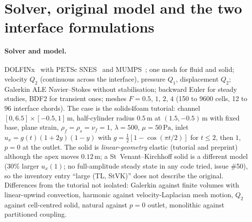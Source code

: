 \documentclass[sn-mathphys,Numbered]{sn-jnl}
\begin{document}
\section{Solver, original model and the two interface formulations}\label{sec:fx_solver}
\paragraph{Solver and model.}
DOLFINx~\citep{Baratta2023} with PETSc SNES~\citep{PETSc} and MUMPS~\citep{MUMPS:1,MUMPS:2}; one mesh for fluid and solid; velocity $Q_2$ (continuous across the interface), pressure $Q_1$, displacement $Q_2$; Galerkin ALE Navier--Stokes without stabilisation; backward Euler for steady studies, BDF2 for transient ones; meshes $F=0.5$, $1$, $2$, $4$ (150 to 9600 cells, 12 to 96 interface chords).
The case is the solids4foam tutorial: channel $[0,6.5]\times[-0.5,1]\,\mathrm{m}$, half-cylinder radius $0.5\,\mathrm{m}$ at $(1.5,-0.5)\,\mathrm{m}$ with fixed base, plane strain, $\rho_f=\rho_s=\nu_f=1$, $\lambda=500$, $\mu=50\,\mathrm{Pa}$, inlet $u_x=g(t)(1+2y)(1-y)$ with $g=\tfrac12[1-\cos(\pi t/2)]$ for $t\le2$, then $1$, $p=0$ at the outlet.
The solid is \emph{linear-geometry} elastic (tutorial and preprint) although the apex moves $0.12\,\mathrm{m}$; a St~Venant--Kirchhoff solid is a different model ($30\%$ larger $u_x(1)$; no full-amplitude steady state in any code tried, issue \#50), so the inventory entry ``large (TL, StVK)'' does not describe the original.
Differences from the tutorial not isolated: Galerkin against finite volumes with linear-upwind convection, harmonic against velocity-Laplacian mesh motion, $Q_2$ against cell-centred solid, natural against $p=0$ outlet, monolithic against partitioned coupling.
\end{document}
